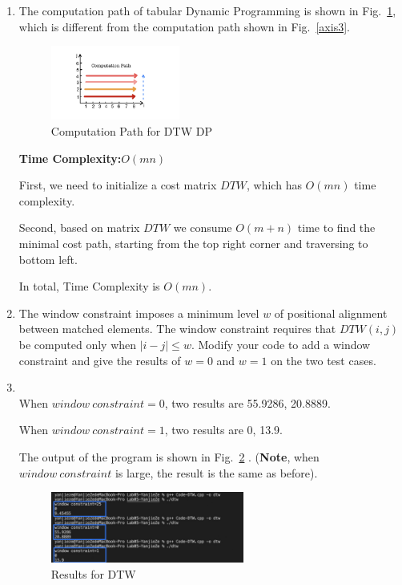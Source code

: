 \documentclass[12pt,a4paper]{article}
\makeatletter
\newtheorem*{solution}{Solution}
\theoremstyle{definition}
\renewenvironment{solution}[1][Solution] {\par\pushQED{\qed}\normalfont\topsep6\p@\@plus6\p@\relax\trivlist\item[\hskip\labelsep\bfseries#1\@addpunct{.}]\ignorespaces}{\popQED\endtrivlist\@endpefalse} \makeatother
\makeatother
\begin{document}
\begin{enumerate}
\begin{enumerate}
\begin{solution}
			The computation path of tabular Dynamic Programming is shown in Fig.~\ref{axis4}, which is different from the computation path shown in Fig.~\ref{axis3}. 
			
		
			
			 \begin{figure}[htbp]
                \centering
                \includegraphics[width=0.4\textwidth]{Lab05-YanjieZe/axis4.jpg}
                \caption{Computation Path for DTW DP}\label{axis4}
            \end{figure}
			
			\textbf{Time Complexity:}$O(mn)$
			
			First, we need to initialize a cost matrix $DTW$, which has $O(mn)$ time complexity.
			
			Second, based on matrix $DTW$ we consume $O(m+n)$ time to find the minimal cost path, starting from the top right corner and traversing to bottom left.
			
			In total, Time Complexity is $O(mn)$.
			
			\end{solution}
			
			\item The window constraint imposes a minimum level $w$ of positional alignment between matched elements. The window constraint requires that $DTW(i, j)$ be computed only when $|i-j| \leq w$. Modify your code to add a window constraint and give the results of $ w=0 $ and $ w=1 $ on the two test cases. 
			\begin{solution}
			~\\
			When $window\ constraint = 0$, two results are 55.9286, 20.8889.
			
			When $window\ constraint = 1$, two results are 0, 13.9.
			
			The output of the program is shown in Fig.~\ref{result2} . (\textbf{Note}, when $window\ constraint$ is large, the result is the same as before).
			\begin{figure}[H]
			    \centering
			    \includegraphics[width=0.6\textwidth]{Lab05-YanjieZe/result2.jpg}
			    \caption{Results for DTW}
			    \label{result2}
			\end{figure}
			\end{solution}
		\end{enumerate}
		
		
	\end{enumerate}
	
\end{document}
